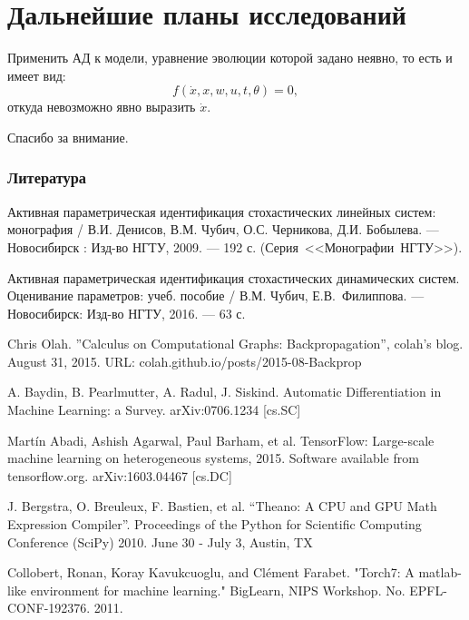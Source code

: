 \documentclass{beamer}
\begin{document}
\section{Дальнейшие планы исследований}


\begin{frame}{\secname}
	Применить АД к модели, уравнение эволюции которой задано неявно, то есть и
	имеет вид: 
	\[
		f(\dot{x},x,w,u,t,\theta)=0,
	\]
	откуда невозможно явно выразить $\dot{x}$.
\end{frame}

\begin{frame}
\begin{center}
  \LARGE{Спасибо за внимание.}
\end{center}
\end{frame}

\begin{frame}[allowframebreaks]
	\frametitle{Литература}
\begin{thebibliography}{9}


 Активная параметрическая идентификация стохастических
линейных систем: монография / В.И. Денисов, В.М. Чубич, О.С. Черникова, Д.И.
	Бобылева. --- Новосибирск : Изд-во НГТУ, 2009. --- 192 с.
	\mbox{(Серия <<Монографии НГТУ>>)}.

 Активная параметрическая идентификация стохастических
	динамических систем. Оценивание параметров: учеб. пособие / В.М. Чубич,
	\mbox{Е.В. Филиппова}. --- Новосибирск: Изд-во НГТУ, 2016. --- 63 с.

 Chris Olah. ''Calculus on Computational Graphs:
Backpropagation'', colah's blog. August 31, 2015.
URL: colah.github.io/posts/2015-08-Backprop

 A. Baydin, B. Pearlmutter, A. Radul, J. Siskind.
Automatic Differentiation in Machine Learning: a Survey. {arXiv:0706.1234 [cs.SC]}

 Martín Abadi, Ashish Agarwal, Paul Barham, et al.
TensorFlow: Large-scale machine learning on heterogeneous systems,
2015. Software available from tensorflow.org. {arXiv:1603.04467 [cs.DC]}

 J. Bergstra, O. Breuleux, F. Bastien, et al. “Theano: A CPU
and GPU Math Expression Compiler”. Proceedings of the Python for Scientific
Computing Conference (SciPy) 2010. June 30 - July 3, Austin, TX

 Collobert, Ronan, Koray Kavukcuoglu, and Clément Farabet.
"Torch7: A matlab-like environment for machine learning." BigLearn, NIPS
Workshop. No. EPFL-CONF-192376. 2011.

\end{thebibliography}
\end{frame}



\frame{\titlepage}
\end{document}
